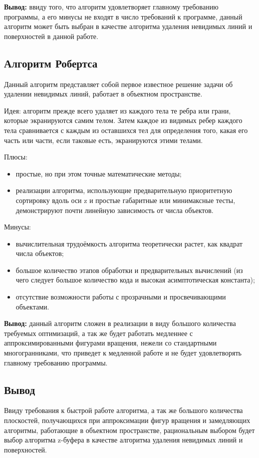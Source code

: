\textbf{Вывод:} ввиду того, что алгоритм удовлетворяет главному требованию программы, а его минусы не входят в число требований к программе, данный алгоритм может быть выбран в качестве алгоритма удаления невидимых линий и поверхностей в данной работе.

\subsection{Алгоритм Робертса}
Данный алгоритм представляет собой первое известное решение задачи об удалении невидимых линий, работает в объектном пространстве. 

Идея: алгоритм прежде всего удаляет из каждого тела те ребра или грани, которые экранируются самим телом. Затем каждое из видимых ребер каждого тела сравнивается с каждым из оставшихся тел для определения того, какая его часть или части, если таковые есть, экранируются этими телами. 

Плюсы:
\begin{itemize}
    \item простые, но при этом точные математические методы;
    \item реализации алгоритма, использующие предварительную приоритетную сортировку вдоль оси z и простые габаритные или минимаксные тесты, демонстрируют почти линейную зависимость от числа объектов.
\end{itemize}

Минусы:
\begin{itemize}
    \item вычислительная трудоёмкость алгоритма теоретически растет, как квадрат числа объектов;
    \item большое количество этапов обработки и предварительных вычислений (из чего следует большое количество кода и высокая асимптотическая константа);
    \item отсутствие возможности работы с прозрачными и просвечивающими объектами.
\end{itemize}

\textbf{Вывод:} данный алгоритм сложен в реализации в виду большого количества требуемых оптимизаций, а так же будет работать медленнее с аппроксимированными фигурами вращения, нежели со стандартными многогранниками, что приведет к медленной работе и не будет удовлетворять главному требованию программы.

\subsection*{Вывод}
Ввиду требования к быстрой работе алгоритма, а так же большого количества плоскостей, получающихся при аппроксимации фигур вращения и замедляющих алгоритмы, работающие в объектном пространстве, рациональным выбором будет выбор алгоритма z-буфера в качестве алгоритма удаления невидимых линий и поверхностей.


